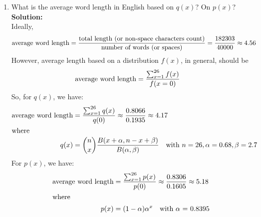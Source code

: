 \documentclass{assignment}
\begin{document}
\begin{enumerate}
\begin{enumerate}
  \item What is the average word length in English based on $q(x)$? On $p(x)$? \\
    \textbf{Solution:} \\
     Ideally,
     \begin{align*}
       \text{average word length} & = \dfrac{\text{total length (or non-space characters count)}}
                                         {\text{number of words (or spaces)}}
                                    = \dfrac{\text{182303}}{\text{40000}}
                                    \approx 4.56
     \end{align*}
     However, average length based on a distribution $f(x)$, in general, should be
     \begin{align*}
       \text{average word length} & = \dfrac{\sum_{x=1}^{26} f(x)}{f(x=0)}
     \end{align*}
     So, for $q(x)$, we have:
     \begin{align*}
       \text{average word length} & = \dfrac{\sum_{x=1}^{26} q(x)}{q(0)} \approx \dfrac{0.8066}{0.1935} \approx 4.17 \\
       \shortintertext{where}
       q(x) & = \dbinom{n}{x} \dfrac{B(x+\alpha, n-x+\beta)}{B(\alpha, \beta)}
              \quad \text{with $n = 26, \alpha = 0.68, \beta = 2.7$}
     \end{align*}
     For $p(x)$, we have:
     \begin{align*}
       \text{average word length} & = \dfrac{\sum_{x=1}^{26} p(x)}{p(0)} \approx \dfrac{0.8306}{0.1605} \approx 5.18 \\
       \shortintertext{where}
       p(x) & = (1- \alpha)\alpha^x \quad \text{with $\alpha$ = 0.8395}
     \end{align*}
  \end{enumerate}
\end{enumerate}
\end{document}
